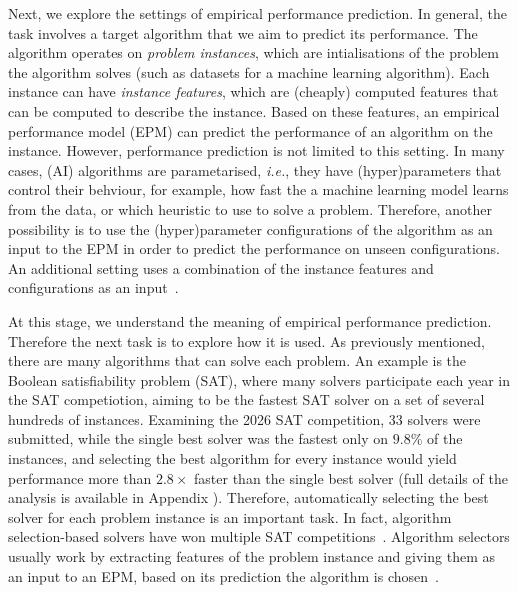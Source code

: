Next, we explore the settings of empirical performance prediction. In general, the task involves a target algorithm that we aim to predict its performance. The algorithm operates on \textit{problem instances}, which are intialisations of the problem the algorithm solves (such as datasets for a machine learning algorithm). Each instance can have \textit{instance features}, which are (cheaply) computed features that can be computed to describe the instance. Based on these features, an empirical performance model (EPM) can predict the performance of an algorithm on the instance. However, performance prediction is not limited to this setting. In many cases, (AI) algorithms are parametarised, \emph{i.e.}, they have (hyper)parameters that control their behviour, for example, how fast the a machine learning model learns from the data, or which heuristic to use to solve a problem. Therefore, another possibility is to use the (hyper)parameter configurations of the algorithm as an input to the EPM in order to predict the performance on unseen configurations. An additional setting uses a combination of the instance features and configurations as an input~\citep{HutEtAl14}.

At this stage, we understand the meaning of empirical performance prediction. Therefore the next task is to explore how it is used. 
As previously mentioned, there are many algorithms that can solve each problem.
An example is the Boolean satisfiability problem (SAT), where many solvers participate each year in the SAT competiotion, aiming to be the fastest SAT solver on a set of several hundreds of instances. Examining the 2026 SAT competition, 33 solvers were submitted, while the single best solver was the fastest only on $9.8\%$ of the instances, and selecting the best algorithm for every instance would yield performance more than $2.8 \times$ faster than the single best solver (full details of the analysis is available in Appendix \todo{}).
Therefore, automatically selecting the best solver for each problem instance is an important task. In fact, algorithm selection-based solvers have won multiple SAT competitions~\citep{XuEtAl08,KadEtAl11}.
Algorithm selectors usually work by extracting features of the problem instance and giving them as an input to an EPM, based on its prediction the algorithm is chosen~\citep{XuEtAl08}.

